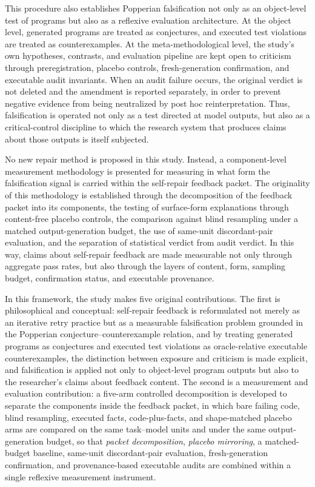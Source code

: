 \documentclass{article}
\numberwithin{equation}{section}  %
\theoremstyle{definition}
\begin{document}
This procedure also establishes Popperian falsification not only as an object-level test of programs
but also as a reflexive evaluation architecture. At the object level, generated programs are treated
as conjectures, and executed test violations are treated as counterexamples. At the meta-methodological
level, the study's own hypotheses, contrasts, and evaluation pipeline are kept open to criticism
through preregistration, placebo controls, fresh-generation confirmation, and executable audit
invariants. When an audit failure occurs, the original verdict is not deleted and the amendment is
reported separately, in order to prevent negative evidence from being neutralized by post hoc
reinterpretation. Thus, falsification is operated not only as a test directed at model outputs, but
also as a critical-control discipline to which the research system that produces claims about those
outputs is itself subjected.

No new repair method is proposed in this study. Instead, a component-level measurement methodology is
presented for measuring in what form the falsification signal is carried within the self-repair
feedback packet. The originality of this methodology is established through the decomposition of the
feedback packet into its components, the testing of surface-form explanations through content-free
placebo controls, the comparison against blind resampling under a matched output-generation budget,
the use of same-unit discordant-pair evaluation, and the separation of statistical verdict from audit
verdict. In this way, claims about self-repair feedback are made measurable not only through aggregate
pass rates, but also through the layers of content, form, sampling budget, confirmation status, and
executable provenance.

In this framework, the study makes five original contributions. The first is philosophical and
conceptual: self-repair feedback is reformulated not merely as an iterative retry practice but as a
measurable falsification problem grounded in the Popperian conjecture--counterexample relation, and by
treating generated programs as conjectures and executed test violations as oracle-relative executable
counterexamples, the distinction between exposure and criticism is made explicit, and falsification is
applied not only to object-level program outputs but also to the researcher's claims about feedback
content. The second is a measurement and evaluation contribution: a five-arm controlled decomposition
is developed to separate the components inside the feedback packet, in which bare failing code, blind
resampling, executed facts, code-plus-facts, and shape-matched placebo arms are compared on the same
task--model units and under the same output-generation budget, so that \emph{packet decomposition},
\emph{placebo mirroring}, a matched-budget baseline, same-unit discordant-pair evaluation,
fresh-generation confirmation, and provenance-based executable audits are combined within a single
reflexive measurement instrument.
\end{document}
